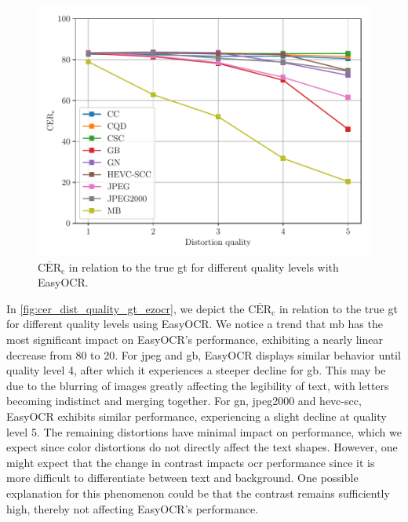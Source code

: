 \begin{figure}
\centering
    \includegraphics[width=\textwidth]{../../images/analyze/cer_dist_quality_gt_ezocr.pdf}
    \caption{$\overline{\text{CER}}_{\text{c}}$ in relation to the true \gls{gt} for different quality levels with EasyOCR.}
\label{fig:cer_dist_quality_gt_ezocr}
\end{figure}
In \autoref{fig:cer_dist_quality_gt_ezocr}, we depict the $\overline{\text{CER}}_{\text{c}}$ in relation to the true \gls{gt} for different quality levels using EasyOCR.
We notice a trend that \gls{mb} has the most significant impact on EasyOCR's performance, exhibiting a nearly linear decrease from 80 to 20.
For \gls{jpeg} and \gls{gb}, EasyOCR displays similar behavior until quality level 4, after which it experiences a steeper decline for \gls{gb}.
This may be due to the blurring of images greatly affecting the legibility of text, with letters becoming indistinct and merging together.
For \gls{gn}, \gls{jpeg}2000 and \gls{hevc}-\gls{scc}, EasyOCR exhibits similar performance, experiencing a slight decline at quality level 5.
The remaining distortions have minimal impact on performance, which we expect since color distortions do not directly affect the text shapes.
However, one might expect that the change in contrast impacts \gls{ocr} performance since it is more difficult to differentiate between text and background.
One possible explanation for this phenomenon could be that the contrast remains sufficiently high, thereby not affecting EasyOCR's performance.

